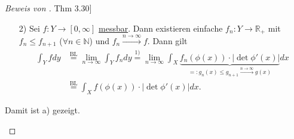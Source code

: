 \documentclass[a4paper]{report}
\newcommand{\doubleOne}{\textbf{1}}
\newcommand{\R}{\mathbb{R}}
\newcommand{\N}{\mathbb{N}}
\newcommand{\Borel}{\mathcal{B}}
\newcommand{\toInf}{\rightarrow \infty}
\newcommand{\limToInf}[1]{\lim_{#1 \toInf}}
\newcommand{\jshortlink}[1]{\jhyperref{#1}{\text{#1}}}
\newcommand{\jhyperref}[2]{\hyperref[j_#1]{#2}}
\newcommand{\jlink}[1]{\jhyperref{#1}{#1}}
\newcommand{\jabb}[3]{ #1: #2 \rightarrow #3 }
\theoremstyle{plain}
\theoremstyle{definition}
\begin{document}
{{{{\begin{proof}[Beweis von \jlink{Thm 3.30}]
\begin{enumerate}
\begin{itemize}
                    Sei $f\ge 0$ einfach mit $f=\sum_{k=1}^m z_k\cdot \doubleOne_{B_k}$, $B_k\in \Borel(Y)$. Da $\phi$ stetig ist, folgt $\phi^{-1}(B_k) =: A_k \in \Borel(X) \ \forall k\in \N$. Weiter ist $B_k = \phi(A_k)$ und es gilt für alle $x\in X, k=1,\dots,m$
                    \[
                        \doubleOne_{A_k}(x) = \begin{cases}
                                                1, & x\in A_k\\
                                                0, & x\notin A_k
                                            \end{cases}
                                            = \begin{cases}
                                                1, &\phi(x) \in \Borel_k\\
                                                0, &\phi(x) \notin \Borel_k
                                            \end{cases}
                                            = \doubleOne_{B_k}(\phi(x)).
                    \]
                    Damit gilt
                    \[
                        \begin{split}
                            \int_Y f dy &= \sum_{k=1}^m z_k\cdot \int_Y \doubleOne_{B_k} dy \overset{\text{s.o.}}{=} \sum_{k=1}^m z_k\cdot \lambda(\phi(A_k))\\
                                        &\overset{\jshortlink{Lem 3.32}}{=} \sum_{k=1}^m z_k \cdot \int_{A_k} |\det \phi'(x)|dx\\
                                        &= \int_X \sum_{k=1}^m z_k\cdot \underbrace{\doubleOne_{A_k}(x)}_{=\doubleOne_{B_k}(\phi(x))}\cdot |\det \phi'(x)|dx\\
                                        &= \int_X f(\phi(x))\cdot |\det \phi(x)|dx.
                        \end{split}
                    \]
                
                \item[2)]
                    Sei $\jabb{f}{Y}{[0,\infty]}$ \jlink{messbar}. Dann existieren einfache $\jabb{f_n}{Y}{\R_+}$ mit $f_n \le f_{n+1}$ ($\forall n\in\N$) und $f_n \xrightarrow{n\rightarrow\infty} f$. Dann gilt
                    \[
                        \begin{split}
                            \int_Y f dy &\overset{\jshortlink{BL}}{=} \limToInf{n} \int_Y f_n dy \overset{1)}{=} \limToInf{n} \int_X \underbrace{f_n(\phi(x))\cdot |\det \phi'(x)|}_{=:g_n(x) \le g_{n+1} \xrightarrow{n\rightarrow\infty} g(x)} dx\\
                            &\overset{\jshortlink{BL}}{=} \int_Xf(\phi(x))\cdot |\det \phi'(x)|dx.
                        \end{split}
                    \]
            \end{itemize}
            Damit ist a) gezeigt.
            

\end{enumerate}
\end{proof}}}}}
\end{document}
